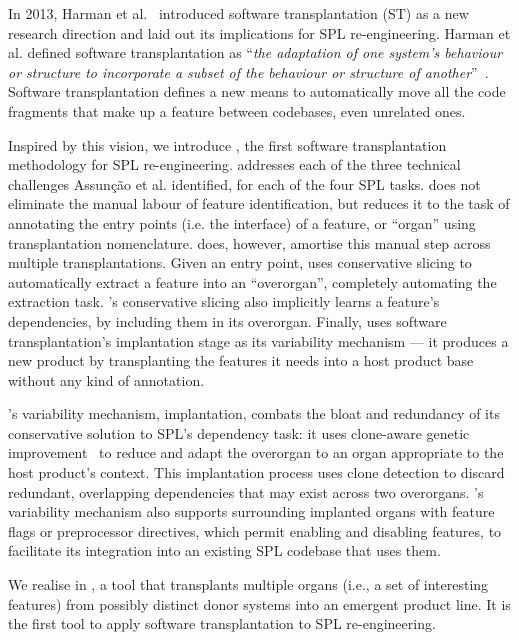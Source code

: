 In 2013, Harman et al.~\cite{Harman2013} introduced software transplantation (ST) as a new research direction and laid out its implications for SPL re-engineering. Harman et al. defined software transplantation as ``\emph{the adaptation of one system's behaviour or structure to incorporate a subset of the behaviour or structure of another}''~\cite{Harman2013}.
Software transplantation defines a new means to automatically move all the code fragments that make up a feature between codebases, even unrelated ones. 

Inspired by this vision, we introduce \FOUNDRY, the first software transplantation methodology for SPL re-engineering.
\FOUNDRY addresses each of the three technical challenges Assunção et al. identified, for each of the four SPL tasks. \FOUNDRY does not eliminate the manual labour of feature identification, but reduces it to the task of annotating the entry points (i.e. the interface) of a feature, or ``organ'' using transplantation nomenclature. \FOUNDRY does, however, amortise this manual step across multiple transplantations. Given an entry point, \FOUNDRY uses conservative slicing to automatically extract a feature into an ``overorgan'', completely automating the extraction task. \FOUNDRY's conservative slicing also implicitly learns a feature's dependencies, by including them in its overorgan.
Finally, \FOUNDRY uses software transplantation's implantation stage as its variability mechanism --- it produces a new product by transplanting the features it needs into a host product base without any kind of annotation. 

\FOUNDRY's variability mechanism, implantation, combats the bloat and redundancy of its conservative solution to SPL's dependency task:  it uses clone-aware genetic improvement~\cite{Petke18:genetic} to reduce and adapt the overorgan to an organ appropriate to the host product's context.
This implantation process uses clone detection to discard redundant, overlapping dependencies that may exist across two overorgans. \FOUNDRY's variability mechanism also supports surrounding implanted organs with feature flags or preprocessor directives, which permit enabling and disabling features, to facilitate its integration into an existing SPL codebase that uses them.

We realise \FOUNDRY in \autoscalpel, a tool that transplants multiple organs (i.e., a set of interesting features) from possibly distinct donor systems into an emergent product line. It is the first tool to apply software transplantation to SPL re-engineering.


